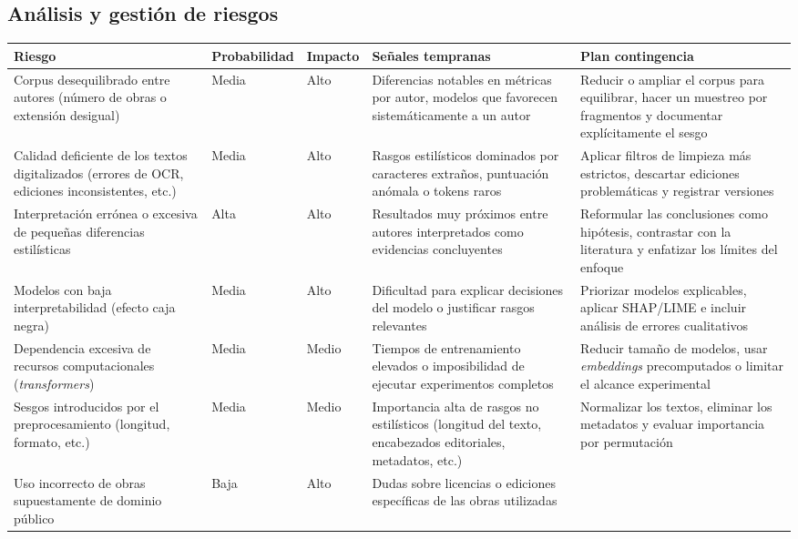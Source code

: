 \documentclass[IB]{TFUOC}%
\begin{document}
\subsection{Análisis y gestión de riesgos}

{\small
\begin{longtable}{|p{3.5cm}|p{2.5cm}|p{1.6cm}|p{3.6cm}|p{3.6cm}|}
\hline
\textbf{Riesgo} & \textbf{Probabilidad} & \textbf{Impacto} & \textbf{Señales tempranas} & \textbf{Plan contingencia} \\
\hline
Corpus desequilibrado entre autores (número de obras o extensión desigual) &
Media &
Alto &
Diferencias notables en métricas por autor, modelos que favorecen sistemáticamente a un autor &
Reducir o ampliar el corpus para equilibrar, hacer un muestreo por fragmentos y documentar explícitamente el sesgo \\
\hline
Calidad deficiente de los textos digitalizados (errores de OCR, ediciones inconsistentes, etc.) &
Media &
Alto &
Rasgos estilísticos dominados por caracteres extraños, puntuación anómala o tokens raros &
Aplicar filtros de limpieza más estrictos, descartar ediciones problemáticas y registrar versiones \\
\hline
Interpretación errónea o excesiva de pequeñas diferencias estilísticas &
Alta &
Alto &
Resultados muy próximos entre autores interpretados como evidencias concluyentes &
Reformular las conclusiones como hipótesis, contrastar con la literatura y enfatizar los límites del enfoque \\
\hline
Modelos con baja interpretabilidad (efecto caja negra) &
Media &
Alto &
Dificultad para explicar decisiones del modelo o justificar rasgos relevantes &
Priorizar modelos explicables, aplicar SHAP/LIME e incluir análisis de errores cualitativos \\
\hline
Dependencia excesiva de recursos computacionales (\textit{transformers}) &
Media &
Medio &
Tiempos de entrenamiento elevados o imposibilidad de ejecutar experimentos completos &
Reducir tamaño de modelos, usar \textit{embeddings} precomputados o limitar el alcance experimental \\
\hline
Sesgos introducidos por el preprocesamiento (longitud, formato, etc.) &
Media &
Medio &
Importancia alta de rasgos no estilísticos (longitud del texto, encabezados editoriales, metadatos, etc.) &
Normalizar los textos, eliminar los metadatos y evaluar importancia por permutación \\
\hline
Uso incorrecto de obras supuestamente de dominio público &
Baja &
Alto &
Dudas sobre licencias o ediciones específicas de las obras utilizadas &

\end{longtable}}
\end{document}
